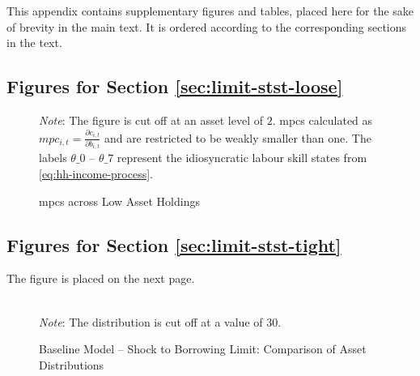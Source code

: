 \documentclass[a4paper,12pt]{article} %
\numberwithin{equation}{section} %
\numberwithin{figure}{section}
\numberwithin{table}{section}
\begin{document}
\begin{refsection}
\begin{appendices}
This appendix contains supplementary figures and tables, placed here for the sake of brevity in the main text. It is ordered according to the corresponding sections in the text.

\subsection{Figures for Section \ref{sec:limit-stst-loose}}
\label{sec-app:figures-limit-loose}

\begin{figure}[H]
    \centering
    \caption{\Gls{mpc}s across Low Asset Holdings}
    \label{fig:baseline-limit-initial-mpcs}
    

    \vspace{10pt}
    
    \begin{minipage}{0.75\textwidth}
    \footnotesize
    \textit{Note}: The figure is cut off at an asset level of $2$. \Gls{mpc}s calculated as $mpc_{i,t} = \frac{\partial c_{i,t}}{\partial b_{i,t}}$ and are restricted to be weakly smaller than one. The labels $\theta\_0$ -- $\theta\_7$ represent the idiosyncratic labour skill states from \eqref{eq:hh-income-process}.
    \end{minipage}
\end{figure}

\subsection{Figures for Section \ref{sec:limit-stst-tight}}
\label{sec-app:figures-limit-tight}

The figure is placed on the next page.

\begin{sidewaysfigure}
    \caption{Baseline Model -- Shock to Borrowing Limit: Comparison of Asset Distributions}
    \label{fig:comparison-stst-baseline-dist}
    \centering

    \\
     \centering
	\textit{Note}: The distribution is cut off at a value of $30$.
\end{sidewaysfigure}


\end{appendices}
\end{refsection}
\end{document}
